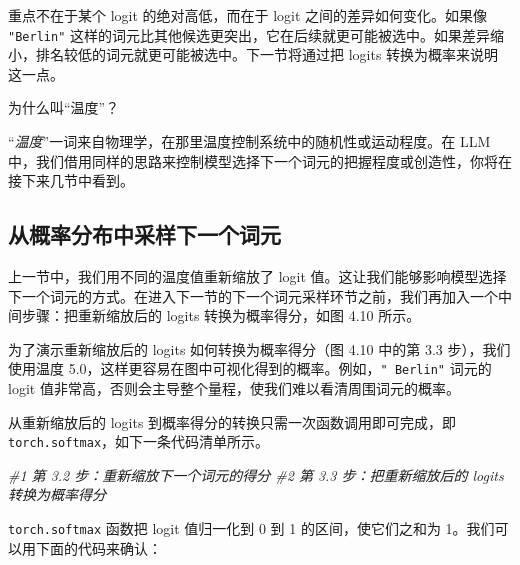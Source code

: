 重点不在于某个 logit 的绝对高低，而在于 logit 之间的差异如何变化。如果像 \texttt{"}\texttt{Berlin}\texttt{"} 这样的词元比其他候选更突出，它在后续就更可能被选中。如果差异缩小，排名较低的词元就更可能被选中。下一节将通过把 logits 转换为概率来说明这一点。

\begin{mySidebar}{为什么叫“温度”？}

“\emph{温度}”一词来自物理学，在那里温度控制系统中的随机性或运动程度。在 LLM 中，我们借用同样的思路来控制模型选择下一个词元的把握程度或创造性，你将在接下来几节中看到。

\end{mySidebar}

\subsection{从概率分布中采样下一个词元}

上一节中，我们用不同的温度值重新缩放了 logit 值。这让我们能够影响模型选择下一个词元的方式。在进入下一节的下一个词元采样环节之前，我们再加入一个中间步骤：把重新缩放后的 logits 转换为概率得分，如图 4.10 所示。

为了演示重新缩放后的 logits 如何转换为概率得分（图 4.10 中的第 3.3 步），我们使用温度 5.0，这样更容易在图中可视化得到的概率。例如，\texttt{"}\texttt{ Berlin}\texttt{"} 词元的 logit 值非常高，否则会主导整个量程，使我们难以看清周围词元的概率。


从重新缩放后的 logits 到概率得分的转换只需一次函数调用即可完成，即 \texttt{torch.softmax}，如下一条代码清单所示。

{\noindent\small\textit{\#1 第 3.2 步：重新缩放下一个词元的得分 \newline \#2 第 3.3 步：把重新缩放后的 logits 转换为概率得分}\par}

\texttt{torch.softmax} 函数把 logit 值归一化到 0 到 1 的区间，使它们之和为 1。我们可以用下面的代码来确认：


